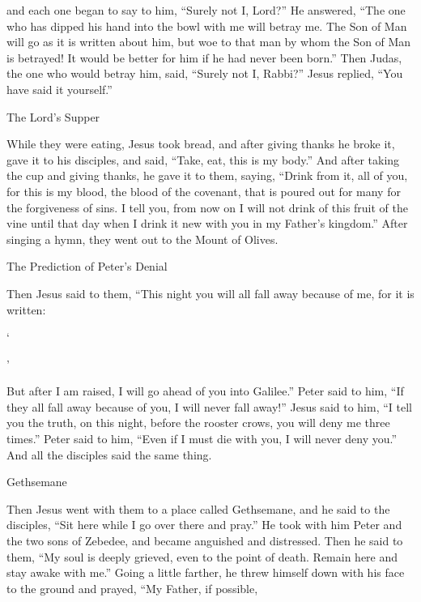 {and
each
one
began
to say
to him,
“Surely not
I,
Lord?”
He answered,
“The one
who has dipped
his hand
into
the bowl
with
me
will betray
me.
The Son
of Man
will go
as
it is written
about
him,
but woe
to that
man
by
whom
the Son
of Man
is betrayed! It would be
better
for him
if
he had
never
been born.”
Then
Judas,
the one who would betray
him,
said,
“Surely not
I,
Rabbi?” Jesus replied,
“You
have said it yourself.”
\par }{\SH The Lord’s Supper
\par }{\PP {}While
they
were eating,
Jesus
took
bread,
and
after giving thanks
he broke
it, gave
it to his disciples,
and said,
“Take,
eat,
this
is
my
body.”
And
after taking
the cup
and
giving thanks,
he gave
it to them,
saying,
“Drink
from
it,
all
of you,
for
this
is
my
blood,
the blood of the covenant,
that is poured out
for
many
for
the forgiveness
of sins.
I tell
you,
from
now on
I will
not
drink
of
this
fruit
of the vine
until
that
day
when
I drink
it
new
with
you
in
my
Father’s
kingdom.”
After singing a hymn,
they went out
to
the Mount
of Olives.
\par }{\SH The Prediction of Peter’s Denial
\par }{\PP {}Then
Jesus
said
to them,
“This
night
you
will
all
fall away
because
of me,
for
it is written:
\par }{\Q ‘{}
\par }{’
\par }{\PI {}But
after
I am raised,
I
will go ahead
of you
into
Galilee.”
Peter
said
to him,
“If
they
all
fall away
because of
you,
I
will
never
fall away!”
Jesus
said
to him,
“I tell
you
the truth,
on
this
night,
before
the rooster
crows,
you will deny
me
three times.”
Peter
said
to him,
“Even
if I
must
die
with
you,
I will
never
deny
you.”
And
all
the disciples
said
the same thing.
\par }{\SH Gethsemane
\par }{\PP {}Then
Jesus
went
with
them
to
a place
called
Gethsemane,
and
he said
to the disciples,
“Sit
here
while
I go over
there
and pray.”
He
took
with him Peter
and
the two
sons
of Zebedee,
and became
anguished
and
distressed.
Then
he said
to them,
“My
soul
is
deeply grieved,
even to the point
of death.
Remain
here
and
stay awake
with
me.”
Going
a little
farther,
he threw
himself down
with
his
face
to the ground and prayed, “My
Father,
if
possible,
}
